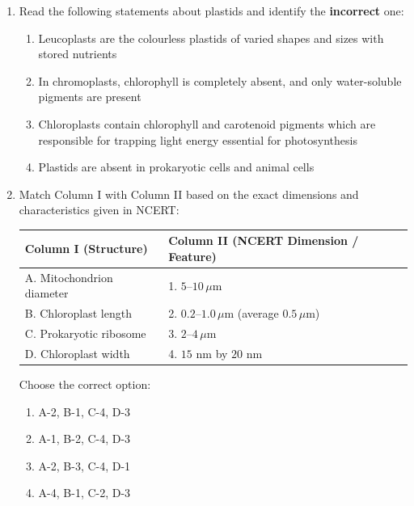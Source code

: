 \documentclass[11pt, a4paper]{article}
\begin{document}
\begin{enumerate}[label=\textbf{\arabic*.}, leftmargin=*, itemsep=8pt]
    \item Read the following statements about plastids and identify the \textbf{incorrect} one:
    \begin{enumerate}[label=(\alph*)]
        \item Leucoplasts are the colourless plastids of varied shapes and sizes with stored nutrients
        \item In chromoplasts, chlorophyll is completely absent, and only water-soluble pigments are present
        \item Chloroplasts contain chlorophyll and carotenoid pigments which are responsible for trapping light energy essential for photosynthesis
        \item Plastids are absent in prokaryotic cells and animal cells
    \end{enumerate}

    \item Match Column I with Column II based on the exact dimensions and characteristics given in NCERT:
    \begin{center}
    \begin{tabular}{@{}ll@{}}
        \toprule
        \textbf{Column I (Structure)} & \textbf{Column II (NCERT Dimension / Feature)} \\
        \midrule
        A. Mitochondrion diameter & 1. $5\text{--}10\,\mu\text{m}$ \\
        B. Chloroplast length & 2. $0.2\text{--}1.0\,\mu\text{m}$ (average $0.5\,\mu\text{m}$) \\
        C. Prokaryotic ribosome & 3. $2\text{--}4\,\mu\text{m}$ \\
        D. Chloroplast width & 4. $15\text{ nm}$ by $20\text{ nm}$ \\
        \bottomrule
    \end{tabular}
    \end{center}
    Choose the correct option:
    \begin{enumerate}[label=(\alph*)]
        \item A-2, B-1, C-4, D-3
        \item A-1, B-2, C-4, D-3
        \item A-2, B-3, C-4, D-1
        \item A-4, B-1, C-2, D-3
    \end{enumerate}


\end{enumerate}
\end{document}
